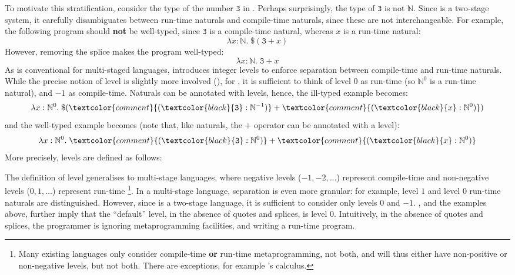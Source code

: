   To motivate this stratification, consider the type of the number \texttt{3} in \sourceLang{}. Perhaps surprisingly, the type of \texttt{3} is not $\mathbb{N}$. Since \sourceLang{} is a two-stage system, it carefully disambiguates between run-time naturals and compile-time naturals, since these are not interchangeable. For example, the following program should \textbf{not} be well-typed, since \texttt{3} is a compile-time natural, whereas $x$ is a run-time natural: 
  \[\lambda x: \mathbb{N}. \; \$(\texttt{3} + x)\]
  However, removing the splice makes the program well-typed:
  \[\lambda x: \mathbb{N}. \; \texttt{3} + x\]
  As is conventional for multi-staged languages, \sourceLang{} introduces integer levels to enforce separation between compile-time and run-time naturals. While the precise notion of level is slightly more involved (), for \sourceLang{}, it is sufficient to think of level $0$ as run-time (so $\mathbb{N}^0$ is a run-time natural), and $-1$ as compile-time. Naturals can be annotated with levels, hence, the ill-typed example becomes:
  \[\lambda x: \mathbb{N}^0. \; \$(\textcolor{comment}{(\textcolor{black}{\texttt{3}}:\mathbb{N}^{-1})} + \textcolor{comment}{(\textcolor{black}{x}:\mathbb{N}^{0})})\]
  and the well-typed example becomes (note that, like naturals, the $+$ operator can be annotated with a level): 
  \[\lambda x: \mathbb{N}^0. \; \textcolor{comment}{(\textcolor{black}{\texttt{3}}:\mathbb{N}^{0})} + \textcolor{comment}{(\textcolor{black}{x}:\mathbb{N}^{0})}\]
  More precisely, levels are defined as follows:


  The definition of level generalises to multi-stage languages, where negative levels ($-1, -2, \ldots$) represent compile-time and non-negative levels ($0, 1, \ldots$) represent run-time \footnote{Many existing languages only consider compile-time \textbf{or} run-time metaprogramming, not both, and will thus either have non-positive or non-negative levels, but not both. There are exceptions, for example \citeauthor{li-2024}'s \citep{li-2024} calculus.}. In a multi-stage language, separation is even more granular: for example, level $1$ and level $0$ run-time naturals are distinguished. However, since \sourceLang{} is a two-stage language, it is sufficient to consider only levels $0$ and $-1$. , and the examples above, further imply that the ``default'' level, in the absence of quotes and splices, is level $0$. Intuitively, in the absence of quotes and splices, the programmer is ignoring metaprogramming facilities, and writing a run-time program. 


